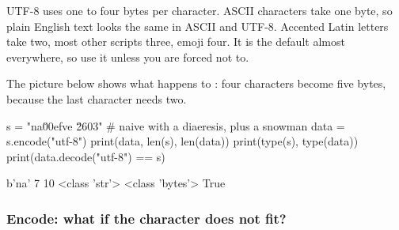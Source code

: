 UTF-8 uses one to four bytes per character. ASCII characters take one byte, so plain English
text looks the same in ASCII and UTF-8. Accented Latin letters take two, most other scripts
three, emoji four. It is the default almost everywhere, so use it unless you are forced not to.

The picture below shows what happens to : four characters become five bytes,
because the last character needs two.

\begin{center}
\end{center}

\begin{pycode}
s = "na\u00efve \u2603"          # naive with a diaeresis, plus a snowman
data = s.encode("utf-8")
print(data, len(s), len(data))
print(type(s), type(data))
print(data.decode("utf-8") == s)
\end{pycode}
\begin{rawcode}
b'na\xafve {}' 7 10
<class 'str'> <class 'bytes'>
True
\end{rawcode}

\subsubsection*{Encode: what if the character does not fit?}

